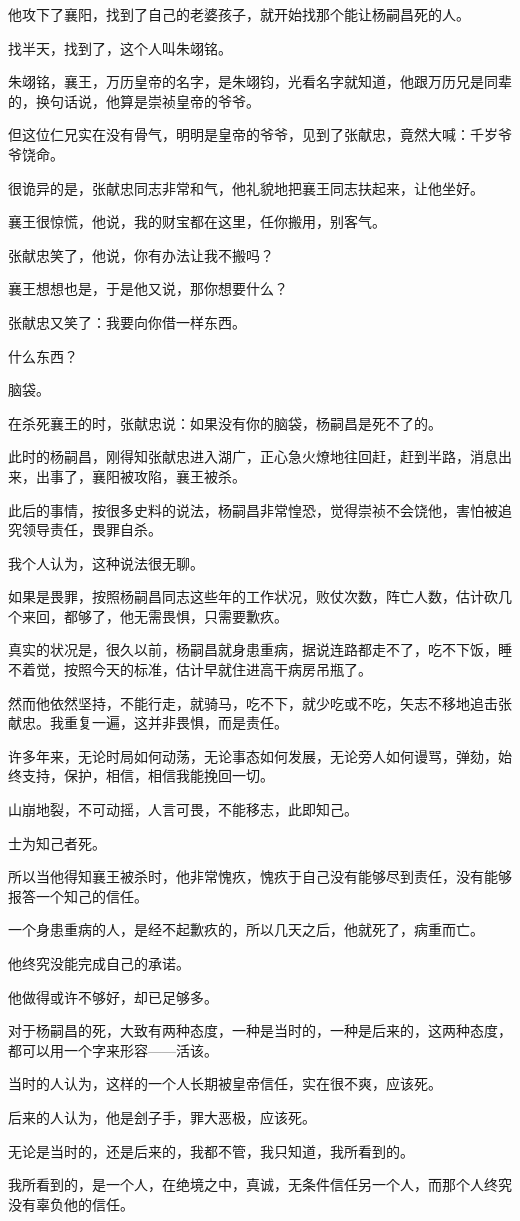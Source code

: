 \begin{multicols}{\theparacolNo}
		他攻下了襄阳，找到了自己的老婆孩子，就开始找那个能让杨嗣昌死的人。

		找半天，找到了，这个人叫朱翊铭。

		朱翊铭，襄王，万历皇帝的名字，是朱翊钧，光看名字就知道，他跟万历兄是同辈的，换句话说，他算是崇祯皇帝的爷爷。

		但这位仁兄实在没有骨气，明明是皇帝的爷爷，见到了张献忠，竟然大喊：千岁爷爷饶命。

		很诡异的是，张献忠同志非常和气，他礼貌地把襄王同志扶起来，让他坐好。

		襄王很惊慌，他说，我的财宝都在这里，任你搬用，别客气。

		张献忠笑了，他说，你有办法让我不搬吗？

		襄王想想也是，于是他又说，那你想要什么？

		张献忠又笑了：我要向你借一样东西。

		什么东西？

		脑袋。

		在杀死襄王的时，张献忠说：如果没有你的脑袋，杨嗣昌是死不了的。

		此时的杨嗣昌，刚得知张献忠进入湖广，正心急火燎地往回赶，赶到半路，消息出来，出事了，襄阳被攻陷，襄王被杀。

		此后的事情，按很多史料的说法，杨嗣昌非常惶恐，觉得崇祯不会饶他，害怕被追究领导责任，畏罪自杀。

		我个人认为，这种说法很无聊。

		如果是畏罪，按照杨嗣昌同志这些年的工作状况，败仗次数，阵亡人数，估计砍几个来回，都够了，他无需畏惧，只需要歉疚。

		真实的状况是，很久以前，杨嗣昌就身患重病，据说连路都走不了，吃不下饭，睡不着觉，按照今天的标准，估计早就住进高干病房吊瓶了。

		然而他依然坚持，不能行走，就骑马，吃不下，就少吃或不吃，矢志不移地追击张献忠。我重复一遍，这并非畏惧，而是责任。

		许多年来，无论时局如何动荡，无论事态如何发展，无论旁人如何谩骂，弹劾，始终支持，保护，相信，相信我能挽回一切。

		山崩地裂，不可动摇，人言可畏，不能移志，此即知己。

		士为知己者死。

		所以当他得知襄王被杀时，他非常愧疚，愧疚于自己没有能够尽到责任，没有能够报答一个知己的信任。

		一个身患重病的人，是经不起歉疚的，所以几天之后，他就死了，病重而亡。

		他终究没能完成自己的承诺。

		他做得或许不够好，却已足够多。

		对于杨嗣昌的死，大致有两种态度，一种是当时的，一种是后来的，这两种态度，都可以用一个字来形容——活该。

		当时的人认为，这样的一个人长期被皇帝信任，实在很不爽，应该死。

		后来的人认为，他是刽子手，罪大恶极，应该死。

		无论是当时的，还是后来的，我都不管，我只知道，我所看到的。

		我所看到的，是一个人，在绝境之中，真诚，无条件信任另一个人，而那个人终究没有辜负他的信任。
		\ifnum{}
	\end{multicols}
\fi
\newpage
